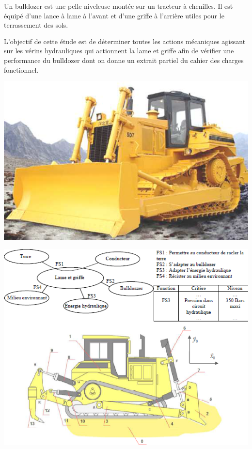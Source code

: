 \documentclass[11pt,oneside]{article}
\begin{document}
\begin{minipage}[c]{.45\linewidth}
Un bulldozer est une pelle niveleuse montée sur un tracteur à chenilles. Il est équipé d'une lance à lame à l'avant et d'une griffe à l'arrière utiles pour le terrassement des sols. 

L'objectif de cette étude est de déterminer toutes les actions mécaniques agissant sur les vérins hydrauliques qui actionnent la lame et griffe afin de vérifier une performance du bulldozer dont on donne un extrait partiel du cahier des charges fonctionnel.
\end{minipage}\hfill
\begin{minipage}[c]{.5\linewidth}
\begin{center}
\includegraphics[width=.9\textwidth]{png/img5}
\end{center}
\end{minipage}

\begin{center}
\includegraphics[width=.9\textwidth]{png/img6}
\end{center}
\end{document}
